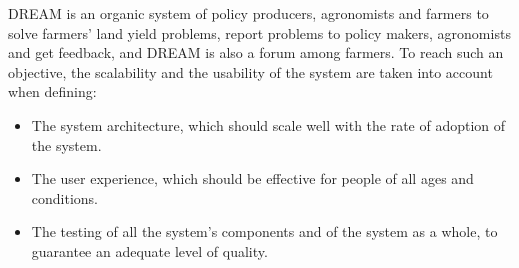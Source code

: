 \documentclass[../../main.tex]{subfiles}
\begin{document}
DREAM is an organic system of policy producers, agronomists and farmers to solve farmers’ land yield problems, report problems to policy makers, agronomists and get feedback, and DREAM is also a forum among farmers.  To reach such an objective, the scalability and the usability of the system are taken into account when defining:

\begin{itemize}
  \item The system architecture, which should scale well with the rate of adoption of the system.
  \item The user experience, which should be effective for people of all ages and conditions.
  \item The testing of all the system’s components and of the system as a whole, to guarantee an adequate level of quality.
\end{itemize}
\end{document}
